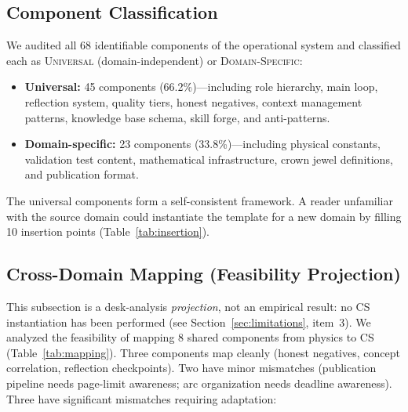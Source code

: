 \documentclass[11pt,a4paper]{article}
\begin{document}
\subsection{Component Classification}

We audited all 68 identifiable components of the operational system and classified
each as \textsc{Universal} (domain-independent) or \textsc{Domain-Specific}:

\begin{itemize}[nosep]
    \item \textbf{Universal:} 45 components (66.2\%)---including role hierarchy,
          main loop, reflection system, quality tiers, honest negatives, context
          management patterns, knowledge base schema, skill forge, and anti-patterns.
    \item \textbf{Domain-specific:} 23 components (33.8\%)---including physical
          constants, validation test content, mathematical infrastructure, crown
          jewel definitions, and publication format.
\end{itemize}

The universal components form a self-consistent framework. A reader unfamiliar
with the source domain could instantiate the template for a new domain by filling
10 insertion points (Table~\ref{tab:insertion}).

\subsection{Cross-Domain Mapping (Feasibility Projection)}

This subsection is a desk-analysis \emph{projection}, not an empirical result: no CS
instantiation has been performed (see Section~\ref{sec:limitations}, item~3). We analyzed
the feasibility of mapping 8 shared components from physics to CS
(Table~\ref{tab:mapping}). Three components map cleanly (honest negatives, concept
correlation, reflection checkpoints). Two have minor mismatches (publication pipeline
needs page-limit awareness; arc organization needs deadline awareness). Three have
significant mismatches requiring adaptation:
\end{document}
